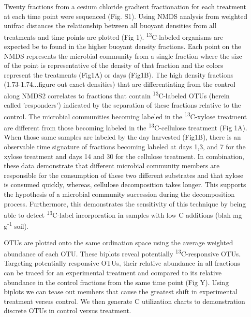 Twenty fractions from a cesium chloride gradient fractionation for each treatment at each time point were sequenced (Fig. S1). Using NMDS analysis from weighted unifrac distances the relationship between all buoyant densities from all treatments and time points are plotted (Fig 1). \textsuperscript{13}C-labeled organisms are expected be to found in the higher buoyant density fractions.  Each point on the NMDS represents the microbial community from a single fraction where the size of the point is representative of the density of that fraction and the colors represent the treatments (Fig1A) or days (Fig1B). The high density fractions (1.73-1.74...figure out exact densities) that are differentiating from the control along NMDS2 correlates to fractions that contain \textsuperscript{13}C-labeled OTUs (herein called 'responders') indicated by the separation of these fractions relative to the control.  The microbial communities becoming labeled in the \textsuperscript{13}C-xylose treatment are different from those becoming labeled in the \textsuperscript{13}C-cellulose treatment (Fig 1A).  When those same samples are labeled by the day harvested (Fig1B), there is an observable time signature of fractions becoming labeled at days 1,3, and 7 for the xylose treatment and days 14 and 30 for the cellulose treatment.  In combination, these data demonstrate that different microbial community members are responsible for the consumption of these two different substrates and that xylose is consumed quickly, whereas, cellulose decomposition takes longer.  This supports the hypothesis of a microbial community succession during the decomposition process.  Furthermore, this demonstrates the sensitivity of this technique by being able to detect \textsuperscript{13}C-label incorporation in samples with low C additions (blah mg g\textsuperscript{-1} soil).    

OTUs are plotted onto the same ordination space using the average weighted abundance of each OTU.  These biplots reveal potentially \textsuperscript{13}C-responsive OTUs. Targeting potentially responsive OTUs, their relative abundance in all fractions can be traced for an experimental treatment and compared to its relative abundance in the control fractions from the same time point (Fig Y). Using biplots we can tease out members that cause the greatest shift in experimental treatment versus control.  We then generate C utilization charts to demonstration discrete OTUs in control versus treatment.        
          
